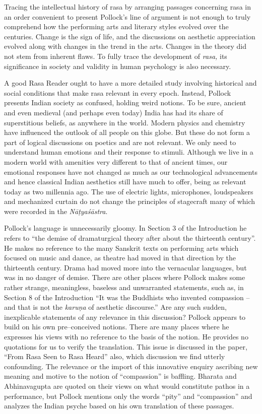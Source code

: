 Tracing the intellectual history of rasa by arranging passages concerning rasa in an order convenient to present Pollock’s line of argument is not enough to truly comprehend how the performing arts and literary styles evolved over the centuries. Change is the sign of life, and the discussions on aesthetic appreciation evolved along with changes in the trend in the arts. Changes in the theory did not stem from inherent flaws. To fully trace the development of \textit{rasa,} its significance in society and validity in human psychology is also necessary.

A good Rasa Reader ought to have a more detailed study involving historical and social conditions that make rasa relevant in every epoch. Instead, Pollock presents Indian society as confused, holding weird notions. To be sure, ancient and even medieval (and perhaps even today) India has had its share of superstitious beliefs, as anywhere in the world. Modern physics and chemistry have influenced the outlook of all people on this globe. But these do not form a part of logical discussions on poetics and are not relevant. We only need to understand human emotions and their response to stimuli. Although we live in a modern world with amenities very different to that of ancient times, our emotional responses have not changed as much as our technological advancements and hence classical Indian aesthetics still have much to offer, being as relevant today as two millennia ago. The use of electric lights, microphones, loudspeakers and mechanized curtain do not change the principles of stagecraft many of which were recorded in the \textit{Nāṭyaśāstra}.

Pollock’s language is unnecessarily gloomy. In Section 3 of the Introduction he refers to “the demise of dramaturgical theory after about the thirteenth century”. He makes no reference to the many Sanskrit texts on performing arts which focused on music and dance, as theatre had moved in that direction by the thirteenth century. Drama had moved more into the vernacular languages, but was in no danger of demise. There are other places where Pollock makes some rather strange, meaningless, baseless and unwarranted statements, such as, in Section 8 of the Introduction “It was the Buddhists who invented compassion – and that is not the \textit{karuṇa} of aesthetic discourse.” Are any such sudden, inexplicable statements of any relevance in this discussion? Pollock appears to build on his own pre–conceived notions. There are many places where he expresses his views with no reference to the basis of the notion. He provides no quotations for us to verify the translation. This issue is discussed in the paper, “From Rasa Seen to Rasa Heard” also, which discussion we find utterly confounding. The relevance or the import of this innovative enquiry ascribing new meaning and motive to the notion of “compassion” is baffling. Bharata and Abhinavagupta are quoted on their views on what would constitute pathos in a performance, but Pollock mentions only the words “pity” and “compassion” and analyzes the Indian psyche based on his own translation of these passages.

